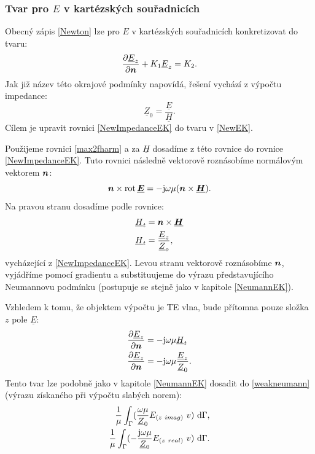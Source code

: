 \documentclass[12pt,a4paper,oneside]{article}
\numberwithin{equation}{section} %
\numberwithin{figure}{section} %
\numberwithin{table}{section} %
\newcommand{\mj}{\mathrm{j}} %
\renewcommand{\vec}[1]{\mbox{\boldmath$#1$}} %
\newcommand{\faz}[1]{{\underline{#1}}} %
\newcommand{\rot}{\mathrm{rot}\ }
\begin{document}
\subsubsection*{Tvar pro \faz{\vec{E}} v kartézských souřadnicích}
Obecný zápis \ref{Newton} lze pro \faz{\vec{E}} v kartézských souřadnicích konkretizovat do tvaru:
\begin{equation}
\label{NewEK}
\frac{\partial \faz{E} _z}{\partial \vec{n}} + K_1 \faz{E} _z = K_2 .
\end{equation}
Jak již název této okrajové podmínky napovídá, řešení vychází z výpočtu impedance: 
\begin{equation}
\label{NewImpedanceEK}
\faz{Z} _0 = \frac{\faz{E}}{\faz{H}} .
\end{equation}
Cílem je upravit rovnici \ref{NewImpedanceEK} do tvaru v \ref{NewEK}.

Použijeme rovnici \ref{max2fharm} a za $\faz{H}$ dosadíme z této rovnice do rovnice \ref{NewImpedanceEK}. Tuto rovnici následně vektorově roznásobíme normálovým vektorem $\vec{n}$:
\begin{equation}
\vec{n} \times \rot \! \faz{\vec{E}} = - \mj \omega \mu (\vec{n} \times \faz{\vec{H}}) .
\end{equation}
Na pravou stranu dosadíme podle rovnice:
\begin{subequations}
\begin{align}
\faz{H} _t &= \vec{n} \times \faz{\vec{H}}
\\
\faz{H} _t &= \frac{\faz{E} _z}{\faz{Z} _o} ,
\end{align}
\end{subequations}
vycházející z \ref{NewImpedanceEK}. Levou stranu vektorově roznásobíme $\vec{n}$, vyjádříme pomocí gradientu a substituujeme do výrazu představujícího Neumannovu podmínku (postupuje se stejně jako v kapitole \ref{NeumannEK}).

Vzhledem k tomu, že objektem výpočtu je TE vlna, bude přítomna pouze složka $z$ pole $\faz{E}$:
\begin{subequations}
\begin{align}
\frac{\partial \faz{E} _z}{\partial \vec{n}} &= - \mj \omega \mu \faz{H} _t
\\
\frac{\partial \faz{E} _z}{\partial \vec{n}} &= - \mj \omega \mu \frac{\faz{E} _z}{\faz{Z} _0} .
\end{align}
\end{subequations}
Tento tvar lze podobně jako v kapitole \ref{NeumannEK} dosadit do \ref{weakneumann} (výrazu získaného při výpočtu slabých norem):
\begin{subequations}
\begin{align}
\frac{1}{\mu} \int _{\Gamma} ( \frac{\omega \mu}{\faz{Z} _0} E _{(z~imag)} ~ v ) ~ \ud \Gamma ,
\\ 
\frac{1}{\mu} \int _{\Gamma} ( - \frac{\mj \omega \mu}{\faz{Z} _0} E _{(z~real)} ~ v ) ~ \ud \Gamma .
\end{align}
\end{subequations}
\end{document}

